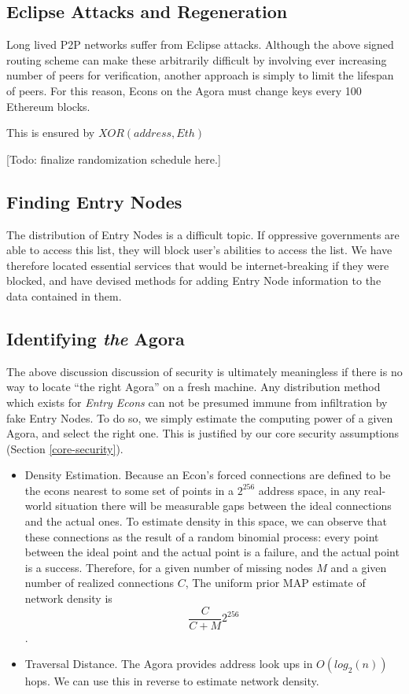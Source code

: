 \documentclass{article}
\begin{document}
\subsection{Eclipse Attacks and Regeneration}
\label{agora-regen}

Long lived P2P networks suffer from Eclipse attacks. Although the
above signed routing scheme can make these arbitrarily difficult by
involving ever increasing number of peers for verification, another
approach is simply to limit the lifespan of peers. For this reason,
Econs on the Agora must change keys every 100 Ethereum blocks.

This is ensured by $XOR(address, Eth)$

[Todo: finalize randomization schedule here.]

\subsection{Finding Entry Nodes}
\label{bootstrapping}

The distribution of Entry Nodes is a difficult topic. If oppressive governments are able to access this list, they will block user's abilities to access the list. We have therefore located essential services that would be internet-breaking if they were blocked, and have devised methods for adding Entry Node information to the data contained in them.

\subsection{Identifying \emph{the} Agora}

The above discussion discussion of security is ultimately meaningless if there is no way to locate ``the right Agora'' on a fresh machine. Any distribution method which exists for \emph{Entry Econs} can not be presumed immune from infiltration by fake Entry Nodes. To do so, we simply estimate the computing power of a given Agora, and select the right one. This is justified by our core security assumptions (Section \ref{core-security}).

\begin{itemize}
\item Density Estimation. Because an Econ's forced connections are defined to be the econs nearest to some set of points in a $2^{256}$ address space, in any real-world situation there will be measurable gaps between the ideal connections and the actual ones. To estimate density in this space, we can observe that these connections as the result of a random binomial process: every point between the ideal point and the actual point is a failure, and the actual point is a success. Therefore, for a given number of missing nodes $M$ and a given number of realized connections $C$, The uniform prior MAP estimate of network density is $$\frac{C}{C + M} 2^{256}$$.
\item Traversal Distance. The Agora provides address look ups in $O(log_2(n))$ hops. We can use this in reverse to estimate network density.
\end{itemize}
\end{document}
